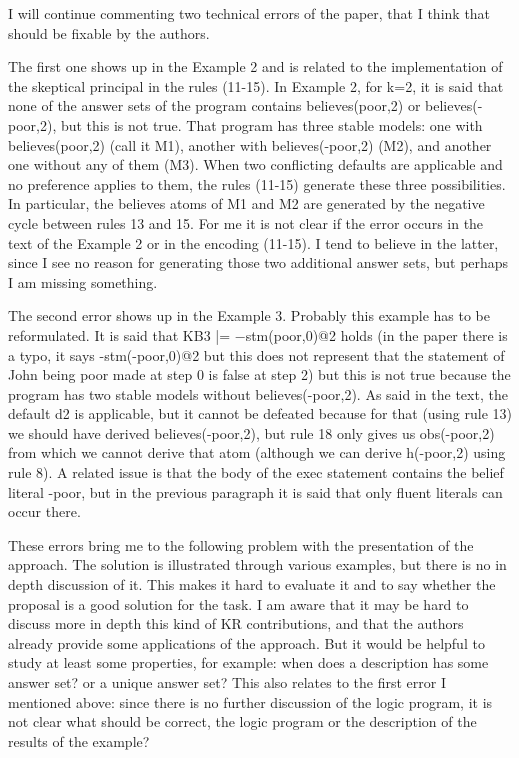I will continue commenting two technical errors of the paper, 
that I think that should be fixable by the authors.

The first one shows up in the Example 2 and is related to 
the implementation of the skeptical principal in the rules (11-15).
In Example 2, for k=2, it is said that none of the answer sets of the program
contains believes(poor,2) or believes(-poor,2), but this is not true.
That program has three stable models: one with believes(poor,2) (call it M1), 
another with believes(-poor,2) (M2), and another one without any of them (M3).
When two conflicting defaults are applicable and no preference applies to them, 
the rules (11-15) generate these three possibilities. 
In particular, the believes atoms of M1 and M2
are generated by the negative cycle between rules 13 and 15. 
For me it is not clear if the error occurs in the text of the Example 2
or in the encoding (11-15). I tend to believe in the latter, since I see 
no reason for generating those two additional answer sets, but perhaps I am missing something.

The second error shows up in the Example 3. 
Probably this example has to be reformulated.
It is said that KB3 |= −stm(poor,0)@2 holds 
(in the paper there is a typo, it says -stm(-poor,0)@2 but this does not represent
that the statement of John being poor made at step 0 is false at step 2)
but this is not true because the program has two stable models without believes(-poor,2).
As said in the text, the default d2 is applicable, but it cannot be defeated
because for that (using rule 13) we should have derived believes(-poor,2),
but rule 18 only gives us obs(-poor,2) from which we cannot derive that atom
(although we can derive h(-poor,2) using rule 8). 
A related issue is that the body of the exec statement contains the belief literal -poor, 
but in the previous paragraph it is said that only fluent literals can occur there.

These errors bring me to the following problem with the presentation of the approach.
The solution is illustrated through various examples, but there is no in depth discussion of it.
This makes it hard to evaluate it and to say whether the proposal is a good solution for the task.
I am aware that it may be hard to discuss more in depth this kind of KR contributions, and
that the authors already provide some applications of the approach.
But it would be helpful to study at least some properties, for example:
when does a description has some answer set? or a unique answer set? 
This also relates to the first error I mentioned above:
since there is no further discussion of the logic program, it is not clear what should be correct, 
the logic program or the description of the results of the example?

